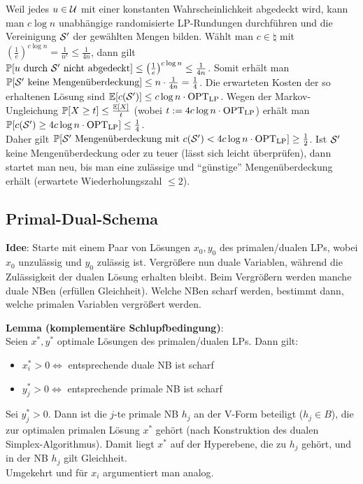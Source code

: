 Weil jedes $u \in \U$ mit einer konstanten Wahrscheinlichkeit abgedeckt wird,
kann man $c \log n$ unabhängige randomisierte
LP-Rundungen durchführen und die Vereinigung $\S'$ der gewählten Mengen bilden.
Wählt man $c \in \natural$ mit
$\left(\frac{1}{e}\right)^{c \log n} = \frac{1}{n^c} \le \frac{1}{4n}$, dann gilt\\
$\PP[\text{$u$ durch $\S'$ nicht abgedeckt}] \le
\left(\frac{1}{e}\right)^{c \log n} \le \frac{1}{4n}$.
Somit erhält man\\
$\PP[\text{$\S'$ keine Mengenüberdeckung}] \le
n \cdot \frac{1}{4n} = \frac{1}{4}$.
Die erwarteten Kosten der so erhaltenen Lösung sind
$\EE[c(\S')] \le c \log n \cdot \OPTLP$.
Wegen der Markov-Ungleichung $\PP[X \ge t] \le \frac{\EE[X]}{t}$
(wobei $t := 4c \log n \cdot \OPTLP$) erhält man
$\PP[c(\S') \ge 4c\log n \cdot \OPTLP] \le \frac{1}{4}$.\\
Daher gilt
$\PP[\text{$\S'$ Mengenüberdeckung mit $c(\S') < 4c \log n \cdot \OPTLP$}] \ge \frac{1}{2}$.
Ist $\S'$ keine Mengenüberdeckung oder zu teuer (lässt sich leicht überprüfen),
dann startet man neu, bis man eine zulässige und "`günstige"' Mengenüberdeckung erhält
(erwartete Wiederholungszahl $\le 2$).

\pagebreak

\subsection{%
    Primal-Dual-Schema%
}

\textbf{Idee}:
Starte mit einem Paar von Lösungen $x_0, y_0$ des primalen/dualen LPs,
wobei $x_0$ unzulässig und $y_0$ zulässig ist.
Vergrößere nun duale Variablen, während die Zulässigkeit der dualen Lösung erhalten bleibt.
Beim Vergrößern werden manche duale NBen  (erfüllen Gleichheit).
Welche NBen scharf werden, bestimmt dann, welche primalen Variablen vergrößert werden.

\textbf{Lemma (komplementäre Schlupfbedingung)}:\\
Seien $x^\ast, y^\ast$ optimale Lösungen des primalen/dualen LPs.
Dann gilt:
\begin{itemize}
    \item
    $x_i^\ast > 0 \iff$ entsprechende duale NB ist scharf

    \item
    $y_j^\ast > 0 \iff$ entsprechende primale NB ist scharf
\end{itemize}

\begin{Beweis}
    Sei $y_j^\ast > 0$.
    Dann ist die $j$-te primale NB $h_j$ an der V-Form beteiligt ($h_j \in B$),
    die zur optimalen primalen Lösung $x^\ast$ gehört
    (nach Konstruktion des dualen Simplex-Algorithmus).
    Damit liegt $x^\ast$ auf der Hyperebene, die zu $h_j$ gehört, und
    in der NB $h_j$ gilt Gleichheit.\\
    Umgekehrt und für $x_i$ argumentiert man analog.
\end{Beweis}

